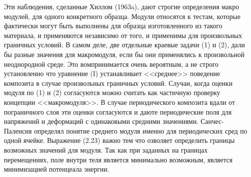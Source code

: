 Эти наблюдения, сделанные Хиллом (1963a), дают строгие определения макро модулей, для одного конкретного образца.
Модули относятся к тестам, которые фактически могут быть выполнены для образца изготовленного из такого материала, и применяются независимо от того, и применимы для произвольных граничных условий. 
В самом деле, две отдельные краевые задачи (1) и (2), дали бы разные значения для макромодуля, если бы они применялись к произвольной неоднородной среде.
Это вомпринимается очень вероятным, а не строго установленно что уравнение (I) устанавливает <<среднее>> поведение композита в случае произвольных граничных условий.
Случаи, когда оценки модуля по (1) и (2) согласуются можно считать как частичную проверку концепции <<макромодуля>>.
В случае периодического композита вдали от пограничного слоя эти оценки согласуются и даюте периодические поля для напряжений и деформаций с одинаковыми средними значениями.
Санчес-Паленсия определял понятие среднего модуля именно для периодических сред по одной ячейке.
 Выражение (2.23) важно тем что озволяет определить границы возможных значений для модуля. 
 Так как при заданных на границах перемещениях, поле внутри теля является минимально возможным, является минимизацией потенцеала энергии.

